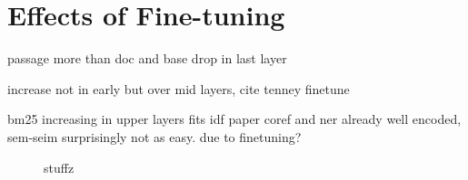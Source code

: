 \section{Effects of Fine-tuning}


passage more than doc and base
drop in last layer

increase not in early but over mid layers, cite tenney finetune

bm25 increasing in upper layers fits idf paper
coref and ner already well encoded, sem-seim surprisingly not as easy. due to finetuning?




\begin{figure}[t]
    \centering
    \begin{subfigure}{\textwidth}
        \centering
    \end{subfigure}

    \begin{subfigure}{\textwidth}
        \centering
    \end{subfigure}

    \caption{stuffz}
    \label{fig:sem_sim_coref}
\end{figure}

